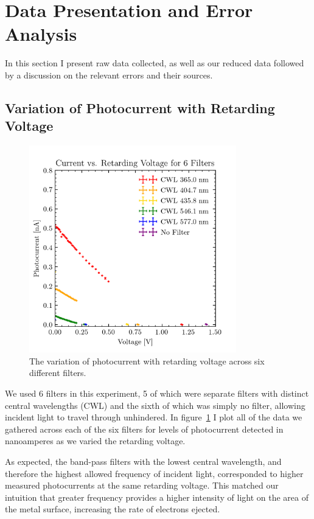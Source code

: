 \documentclass[aps,twocolumn,secnumarabic,balancelastpage,amsmath,amssymb,nofootinbib, floatfix]{revtex4-2}
\begin{document}
\section{Data Presentation and Error Analysis}


In this section I present raw data collected, as well as our reduced data followed by a discussion on the relevant errors and their sources. 

\subsection{Variation of Photocurrent with Retarding Voltage}

\begin{figure}[H]
	\centering
	\includegraphics[width=9cm]{all_lenses_scatter.png}
	\caption{The variation of photocurrent with retarding voltage across six different filters.}
	\label{fig:allfilters}
\end{figure}

We used 6 filters in this experiment, 5 of which were separate filters with distinct central wavelengths (CWL) and the sixth of which was simply no filter, allowing incident light to travel through unhindered. In figure~\ref{fig:allfilters} I plot all of the data we gathered across each of the six filters for levels of photocurrent detected in nanoamperes as we varied the retarding voltage. 

As expected, the band-pass filters with the lowest central wavelength, and therefore the highest allowed frequency of incident light, corresponded to higher measured photocurrents at the same retarding voltage. This matched our intuition that greater frequency provides a higher intensity of light on the area of the metal surface, increasing the rate of electrons ejected. 
\end{document}
